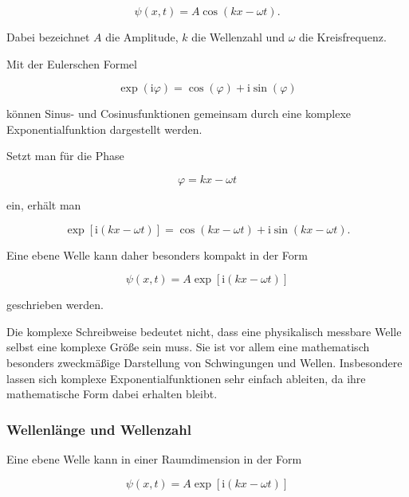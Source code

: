 \begin{equation}
	\psi(x,t)
	=
	A\cos(kx-\omega t).
	\label{eq:app_harmonische_welle_cosinus}
\end{equation}

Dabei bezeichnet \(A\) die Amplitude, \(k\) die Wellenzahl und
\(\omega\) die Kreisfrequenz.

Mit der Eulerschen Formel

\begin{equation}
	\exp(\mathrm{i}\varphi)
	=
	\cos(\varphi)
	+
	\mathrm{i}\sin(\varphi)
	\label{eq:app_eulersche_formel}
\end{equation}

können Sinus- und Cosinusfunktionen gemeinsam durch eine komplexe
Exponentialfunktion dargestellt werden.

Setzt man für die Phase

\begin{equation}
	\varphi
	=
	kx-\omega t
\end{equation}

ein, erhält man

\begin{equation}
	\exp\left[\mathrm{i}(kx-\omega t)\right]
	=
	\cos(kx-\omega t)
	+
	\mathrm{i}\sin(kx-\omega t).
\end{equation}

Eine ebene Welle kann daher besonders kompakt in der Form

\begin{equation}
	\boxed{
		\psi(x,t)
		=
		A\exp\left[\mathrm{i}(kx-\omega t)\right]
	}
	\label{eq:app_ebene_welle}
\end{equation}

geschrieben werden.

Die komplexe Schreibweise bedeutet nicht, dass eine physikalisch messbare
Welle selbst eine komplexe Größe sein muss. Sie ist vor allem eine
mathematisch besonders zweckmäßige Darstellung von Schwingungen und Wellen.
Insbesondere lassen sich komplexe Exponentialfunktionen sehr einfach
ableiten, da ihre mathematische Form dabei erhalten bleibt.


\subsubsection*{Wellenlänge und Wellenzahl}

Eine ebene Welle kann in einer Raumdimension in der Form

\begin{equation}
	\psi(x,t)
	=
	A\exp\left[\mathrm{i}(kx-\omega t)\right]
	\label{eq:app_ebene_welle}
\end{equation}

